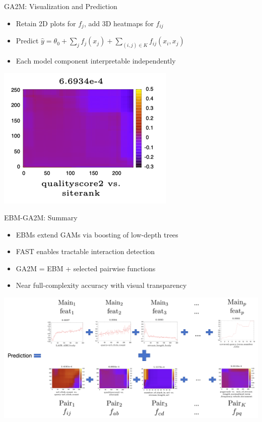 \documentclass[11pt,compress,t,notes=noshow,aspectratio=169,xcolor=table]{beamer}
\begin{document}
\begin{frame}{GA2M: Visualization and Prediction} \begin{itemize} \item Retain 2D plots for $f_j$, add 3D heatmaps for $f_{ij}$ \item Predict $\hat{y} = \theta_0 + \sum_j f_j(x_j) + \sum_{(i,j)\in K} f_{ij}(x_i, x_j)$ \item Each model component interpretable independently \end{itemize} \includegraphics[width=0.5\linewidth]{figure/3D Heatmap.png} \end{frame}

\begin{frame}{EBM-GA2M: Summary} \begin{itemize} \item EBMs extend GAMs via boosting of low-depth trees \item FAST enables tractable interaction detection \item GA2M = EBM + selected pairwise functions \item Near full-complexity accuracy with visual transparency \end{itemize} \includegraphics[width=1\linewidth]{figure/final_ebm.png} \end{frame}
\end{document}
